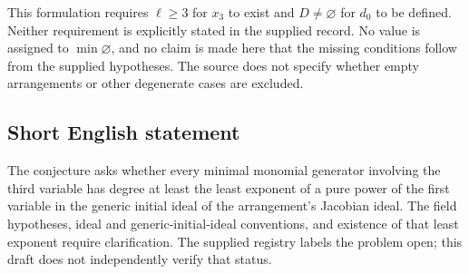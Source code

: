 \documentclass[11pt]{article}
\begin{document}
This formulation requires \(\ell\geq 3\) for \(x_3\) to exist and \(D\neq\varnothing\) for \(d_0\) to be defined. Neither requirement is explicitly stated in the supplied record. No value is assigned to \(\min\varnothing\), and no claim is made here that the missing conditions follow from the supplied hypotheses. The source does not specify whether empty arrangements or other degenerate cases are excluded.
\subsection{Short English statement}
The conjecture asks whether every minimal monomial generator involving the third variable has degree at least the least exponent of a pure power of the first variable in the generic initial ideal of the arrangement's Jacobian ideal. The field hypotheses, ideal and generic-initial-ideal conventions, and existence of that least exponent require clarification. The supplied registry labels the problem open; this draft does not independently verify that status.
\end{document}
